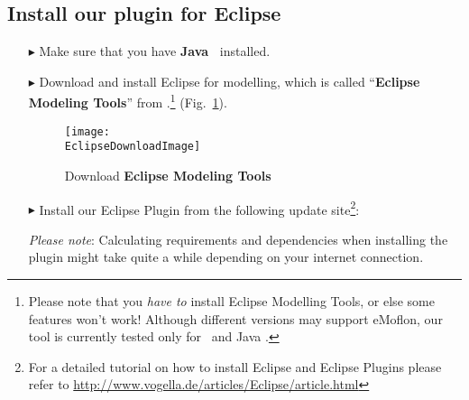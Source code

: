 \genHeader
\hypertarget{installPlugin common}{} 
\subsection{Install our plugin for Eclipse}
 
\vspace{0.5cm}
 
\begin{itemize}

\item[$\blacktriangleright$] Make sure that you have \textbf{Java~\JavaVersion{}} installed.
 
\item[$\blacktriangleright$] Download and install Eclipse \EclipseVersion for modelling, which is called ``\textbf{Eclipse Modeling Tools}'' from \EclipseDownloadLink.\footnote{Please
note that you \emph{have to} install Eclipse Modelling Tools, or else some features won't work! Although different versions may support eMoflon, our tool is
currently tested only for \EclipseVersion~and Java \JavaVersion.} (Fig.~\ref{eclipseDownload}).

\begin{figure}[htbp]
	\centering
  	\texttt{[image: \\EclipseDownloadImage]}
	\caption{Download \textbf{Eclipse Modeling Tools}}
	\label{eclipseDownload}
\end{figure}

\vspace{0.9cm}

\item[$\blacktriangleright$] Install our Eclipse Plugin from the following update site\footnote{For a detailed tutorial on how to install Eclipse and Eclipse
Plugins please refer to \url{http://www.vogella.de/articles/Eclipse/article.html}}: \eMoflonUpdateSite

\emph{Please note}: Calculating requirements and dependencies when
installing the plugin might take quite a while depending on your internet connection.

\end{itemize}
